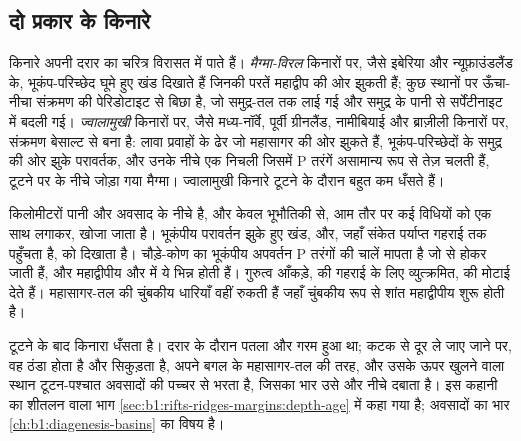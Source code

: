 \subsection*{दो प्रकार के किनारे}

किनारे अपनी दरार का चरित्र विरासत में पाते हैं। \emph{मैग्मा-विरल} किनारों पर, जैसे इबेरिया और न्यूफ़ाउंडलैंड के, भूकंप-परिच्छेद घूमे हुए खंड दिखाते हैं जिनकी परतें महाद्वीप की ओर झुकती हैं; कुछ स्थानों पर ऊँचा-नीचा संक्रमण  की पेरिडोटाइट से बिछा है, जो समुद्र-तल तक लाई गई और समुद्र के पानी से सर्पेंटीनाइट में बदली गई। \emph{ज्वालामुखी} किनारों पर, जैसे मध्य-नॉर्वे, पूर्वी ग्रीनलैंड, नामीबियाई और ब्राज़ीली किनारों पर, संक्रमण बेसाल्ट से बना है: लावा प्रवाहों के ढेर जो महासागर की ओर झुकते हैं, भूकंप-परिच्छेदों के समुद्र की ओर झुके परावर्तक, और उनके नीचे एक निचली  जिसमें P तरंगें असामान्य रूप से तेज़ चलती हैं, टूटने पर  के नीचे जोड़ा गया मैग्मा। ज्वालामुखी किनारे टूटने के दौरान बहुत कम धँसते हैं।

\begin{inthefield}[महाद्वीप के किनारे का पता लगाना]
 किलोमीटरों पानी और अवसाद के नीचे है, और केवल भूभौतिकी से, आम तौर पर कई विधियों को एक साथ लगाकर, खोजा जाता है। भूकंपीय परावर्तन झुके हुए खंड,  और, जहाँ संकेत पर्याप्त गहराई तक पहुँचता है,  को दिखाता है। चौड़े-कोण का भूकंपीय अपवर्तन P तरंगों की चालें मापता है जो  से होकर जाती हैं, और महाद्वीपीय और  में ये भिन्न होती हैं। गुरुत्व आँकड़े,  की गहराई के लिए व्युत्क्रमित,  की मोटाई देते हैं। महासागर-तल की चुंबकीय धारियाँ वहीं रुकती हैं जहाँ चुंबकीय रूप से शांत महाद्वीपीय  शुरू होती है।
\end{inthefield}

टूटने के बाद किनारा धँसता है। दरार के दौरान  पतला और गरम हुआ था; कटक से दूर ले जाए जाने पर, वह ठंडा होता है और सिकुड़ता है, अपने बगल के महासागर-तल की तरह, और उसके ऊपर खुलने वाला स्थान टूटन-पश्चात अवसादों की पच्चर से भरता है, जिसका भार उसे और नीचे दबाता है। इस कहानी का शीतलन वाला भाग \cref{sec:b1:rifts-ridges-margins:depth-age} में कहा गया है; अवसादों का भार \cref{ch:b1:diagenesis-basins} का विषय है।

